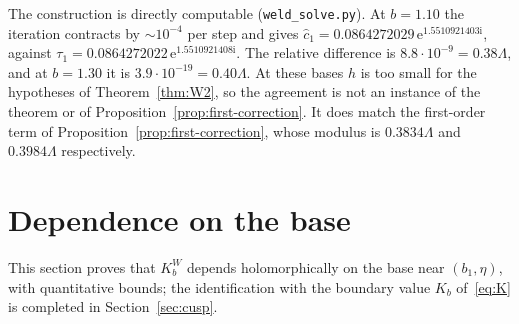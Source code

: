 \documentclass[11pt]{amsart}
\theoremstyle{definition}
\newcommand{\Kk}{K}
\newcommand{\eee}{\mathrm{e}}
\newcommand{\ii}{\mathrm{i}}
\begin{document}
\noindent
The construction is directly computable (\texttt{weld\_solve.py}).  At
$b=1.10$ the iteration contracts by $\sim10^{-4}$ per step and gives
$\hat c_1=0.0864272029\,\eee^{1.5510921403\ii}$, against
$\tau_1=0.0864272022\,\eee^{1.5510921408\ii}$.  The relative difference is
$8.8\cdot10^{-9}=0.38\Lambda$, and at $b=1.30$ it is $3.9\cdot10^{-19}=0.40\Lambda$.
At these bases $h$ is too small for the hypotheses of Theorem~\ref{thm:W2}, so
the agreement is not an instance of the theorem or of
Proposition~\ref{prop:first-correction}.  It does match the first-order term of
Proposition~\ref{prop:first-correction}, whose modulus is $0.3834\Lambda$ and
$0.3984\Lambda$ respectively.

\section{Dependence on the base}\label{sec:W1}

This section proves that $\Kk^W_b$ depends holomorphically on the base near
$(b_1,\eta)$, with quantitative bounds; the identification with the boundary
value $\Kk_b$ of~\eqref{eq:K} is completed in Section~\ref{sec:cusp}.
\end{document}
